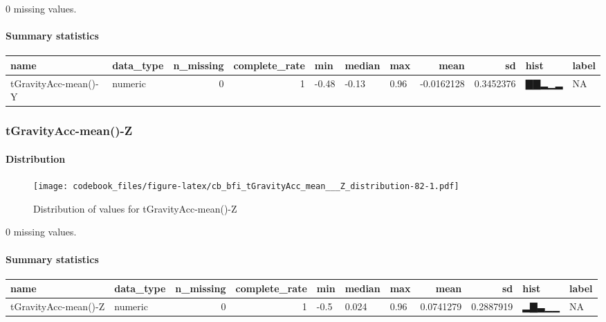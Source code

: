 \documentclass[
]{article}
\begin{document}
0 missing values.

\hypertarget{tGravityAcc_mean___Y_summary}{%
\paragraph{Summary statistics}\label{tGravityAcc_mean___Y_summary}}

\begin{longtable}[]{@{}llrrlllrrll@{}}
\toprule
name & data\_type & n\_missing & complete\_rate & min & median & max &
mean & sd & hist & label \\
\midrule
\endhead
tGravityAcc-mean()-Y & numeric & 0 & 1 & -0.48 & -0.13 & 0.96 &
-0.0162128 & 0.3452376 & ▇▇▂▁▂ & NA \\
\bottomrule
\end{longtable}

\hypertarget{tGravityAcc_mean___Z}{%
\subsubsection{tGravityAcc-mean()-Z}\label{tGravityAcc_mean___Z}}

\hypertarget{tGravityAcc_mean___Z_distribution}{%
\paragraph{Distribution}\label{tGravityAcc_mean___Z_distribution}}

\begin{figure}
\centering
\texttt{[image: codebook\_files/figure-latex/cb\_bfi\_tGravityAcc\_mean\_\_\_Z\_distribution-82-1.pdf]}
\caption{Distribution of values for tGravityAcc-mean()-Z}
\end{figure}

0 missing values.

\hypertarget{tGravityAcc_mean___Z_summary}{%
\paragraph{Summary statistics}\label{tGravityAcc_mean___Z_summary}}

\begin{longtable}[]{@{}llrrlllrrll@{}}
\toprule
name & data\_type & n\_missing & complete\_rate & min & median & max &
mean & sd & hist & label \\
\midrule
\endhead
tGravityAcc-mean()-Z & numeric & 0 & 1 & -0.5 & 0.024 & 0.96 & 0.0741279
& 0.2887919 & ▂▇▃▁▁ & NA \\
\bottomrule
\end{longtable}
\end{document}
